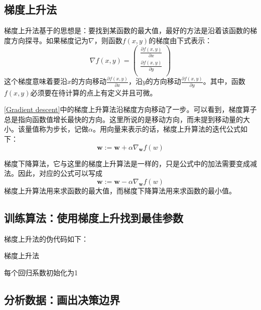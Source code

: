 \subsection{梯度上升法}
梯度上升法基于的思想是：要找到某函数的最大值，最好的方法是沿着该函数的梯度方向探寻。如果梯度记为$\nabla$，则函数$f(x,y)$的梯度由下式表示：
\begin{equation*}
    \nabla f(x,y)=
    \left (
    \begin{array}{c}
        \frac{\partial f(x, y)}{\partial x} \\
        \frac{\partial f(x, y)}{\partial y} \\
    \end{array}
    \right )
\end{equation*}
这个梯度意味着要沿$x$的方向移动$\frac{\partial f(x, y)}{\partial x}$，沿$y$的方向移动$\frac{\partial f(x, y)}{\partial y}$。其中，函数$f(x,y)$必须要在待计算的点上有定义并且可微。


\autoref{Gradient descent}中的梯度上升算法沿梯度方向移动了一步。可以看到，梯度算子总是指向函数值增长最快的方向。这里所说的是移动方向，而未提到移动量的大小。该量值称为步长，记做$\alpha$。用向量来表示的话，梯度上升算法的迭代公式如下：
\begin{equation*}
    \bm{w}:=\bm{w}+\alpha\nabla_{\bm{w}}f(w)
\end{equation*}

\begin{tcolorbox}[title=梯度下降]
    梯度下降算法，它与这里的梯度上升算法是一样的，只是公式中的加法需要变成减法。因此，对应的公式可以写成
    \begin{equation*}
        \bm{w}:=\bm{w}-\alpha\nabla_{\bm{w}}f(w)
    \end{equation*}
    梯度上升算法用来求函数的最大值，而梯度下降算法用来求函数的最小值。
\end{tcolorbox}

\subsection{训练算法：使用梯度上升找到最佳参数}
梯度上升法的伪代码如下：
\begin{algorithm}
    \caption{梯度上升法}
    每个回归系数初始化为1\;
\end{algorithm}

\subsection{分析数据：画出决策边界}
